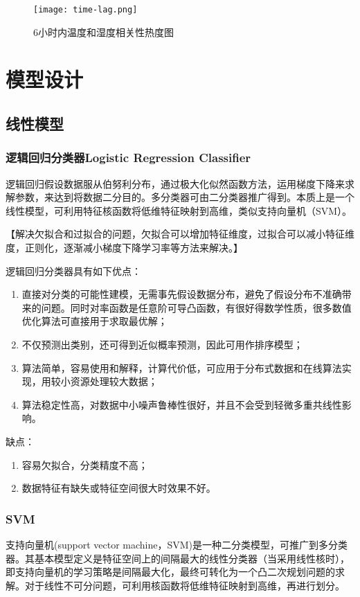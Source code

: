\documentclass[UTF8]{ctexart}
\begin{document}
\begin{figure}[h] %
  \centering
  \texttt{[image: time-lag.png]}
  \caption{6小时内温度和湿度相关性热度图}
  \label{fig:timelag}
\end{figure}



\section{模型设计}

\subsection{线性模型}

\subsubsection{逻辑回归分类器Logistic Regression Classifier}

逻辑回归假设数据服从伯努利分布，通过极大化似然函数方法，运用梯度下降来求解参数，来达到将数据二分目的。多分类器可由二分类器推广得到。本质上是一个线性模型，可利用特征核函数将低维特征映射到高维，类似支持向量机（SVM）。

【解决欠拟合和过拟合的问题，欠拟合可以增加特征维度，过拟合可以减小特征维度，正则化，逐渐减小梯度下降学习率等方法来解决。】

逻辑回归分类器具有如下优点：
\begin{enumerate}[(1)]
	\item 直接对分类的可能性建模，无需事先假设数据分布，避免了假设分布不准确带来的问题。同时对率函数是任意阶可导凸函数，有很好得数学性质，很多数值优化算法可直接用于求取最优解；
	\item 不仅预测出类别，还可得到近似概率预测，因此可用作排序模型；
	\item 算法简单，容易使用和解释，计算代价低，可应用于分布式数据和在线算法实现，用较小资源处理较大数据；
	\item 算法稳定性高，对数据中小噪声鲁棒性很好，并且不会受到轻微多重共线性影响。
\end{enumerate}

缺点：
\begin{enumerate}[(1)]
	\item 容易欠拟合，分类精度不高；
	\item 数据特征有缺失或特征空间很大时效果不好。
\end{enumerate}


\subsubsection{SVM}
支持向量机(support vector machine，SVM)是一种二分类模型，可推广到多分类器。其基本模型定义是特征空间上的间隔最大的线性分类器（当采用线性核时），即支持向量机的学习策略是间隔最大化，最终可转化为一个凸二次规划问题的求解。对于线性不可分问题，可利用核函数将低维特征映射到高维，再进行划分。
\end{document}
